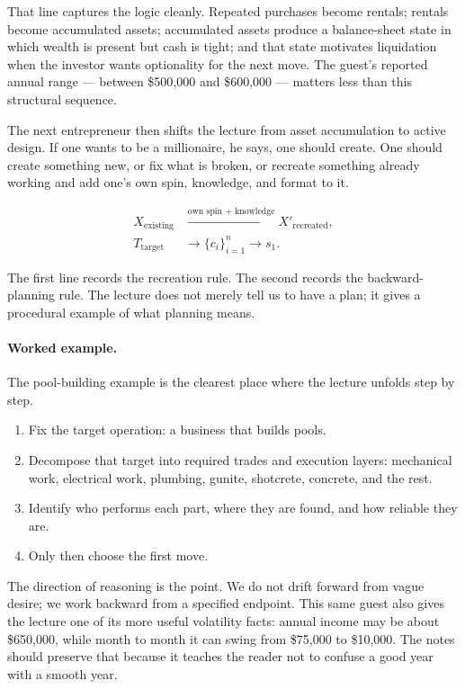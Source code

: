 That line captures the logic cleanly. Repeated purchases become rentals; rentals become accumulated assets; accumulated assets produce a balance-sheet state in which wealth is present but cash is tight; and that state motivates liquidation when the investor wants optionality for the next move. The guest's reported annual range --- between \$500{,}000 and \$600{,}000 --- matters less than this structural sequence.

The next entrepreneur then shifts the lecture from asset accumulation to active design. If one wants to be a millionaire, he says, one should create. One should create something new, or fix what is broken, or recreate something already working and add one's own spin, knowledge, and format to it.

\begin{align}
X_{\mathrm{existing}} &\xrightarrow{\text{own spin + knowledge}} X'_{\mathrm{recreated}},\\
T_{\mathrm{target}} &\to \{c_i\}_{i=1}^{n} \to s_1.
\end{align}

The first line records the recreation rule. The second records the backward-planning rule. The lecture does not merely tell us to have a plan; it gives a procedural example of what planning means.

\paragraph{Worked example.} The pool-building example is the clearest place where the lecture unfolds step by step.
\begin{enumerate}
\item Fix the target operation: a business that builds pools.
\item Decompose that target into required trades and execution layers: mechanical work, electrical work, plumbing, gunite, shotcrete, concrete, and the rest.
\item Identify who performs each part, where they are found, and how reliable they are.
\item Only then choose the first move.
\end{enumerate}

The direction of reasoning is the point. We do not drift forward from vague desire; we work backward from a specified endpoint. This same guest also gives the lecture one of its more useful volatility facts: annual income may be about \$650{,}000, while month to month it can swing from \$75{,}000 to \$10{,}000. The notes should preserve that because it teaches the reader not to confuse a good year with a smooth year.

